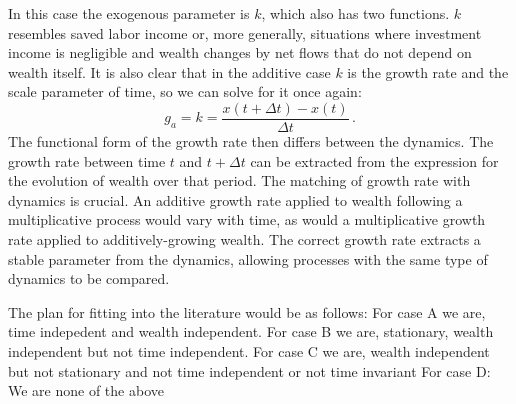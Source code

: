 \documentclass[11pt]{article}
\newtheorem{proposition}{Proposition}
\newcommand{\Aref}[1]{Axiom~\ref{ax:#1}}
\newcommand{\be}{\begin{equation}}
\newcommand{\ee}{\end{equation}}
\newcommand{\Dt}{\Delta t}
\newcommand{\Dx}{\Delta x}
\numberwithin{equation}{section}
\begin{document}
In this case the exogenous parameter is $k$, which also has two functions. $k$ resembles saved labor income or, more generally, situations where investment income is negligible and wealth changes by net flows that do not depend on wealth itself. It is also clear that in the additive case $k$ is the growth rate and the scale parameter of time, so we can solve for it once again: 
%
\be
g_a=k = \frac{x\left(t+\Dt\right) - x\left(t\right)}{\Dt}\,.
\ee
%
The functional form of the growth rate then differs between the dynamics. The growth rate between time $t$ and $t+\Dt$ can be extracted from the expression for the evolution of wealth over that period. The matching of growth rate with dynamics is crucial. An additive growth rate applied to wealth following a multiplicative process would vary with time, as would a multiplicative growth rate applied to additively-growing wealth. The correct growth rate extracts a stable parameter from the dynamics, allowing processes with the same type of dynamics to be compared.

The plan for fitting into the literature would be as follows: 
For case A we are, time indepedent and wealth independent. 
For case B we are, stationary, wealth independent but not time independent.
For case C we are, wealth independent but not stationary and not time independent or not time invariant
For case D: We are none of the above


%
\end{document}
